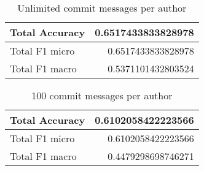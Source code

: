 \begin{table}[H]
  \def\arraystretch{1.15}%
  \centering
  \label{fig:unlimited_commits}
  \caption{Unlimited commit messages per author}
  \bigskip
  \begin{tabular}{| l | r |}
    \hline
    Total Accuracy & 0.6517433833828978 \\
    \hline
    Total F1 micro & 0.6517433833828978 \\
    \hline
    Total F1 macro & 0.5371101432803524 \\
    \hline
  \end{tabular}
\end{table}

\begin{table}[H]
  \def\arraystretch{1.15}%
  \centering
  \label{fig:limited_commits}
  \caption{100 commit messages per author}
  \bigskip
  \begin{tabular}{| l | r |}
    \hline
    Total Accuracy & 0.6102058422223566 \\
    \hline
    Total F1 micro & 0.6102058422223566 \\
    \hline
    Total F1 macro & 0.4479298698746271 \\
    \hline
  \end{tabular}
\end{table}

